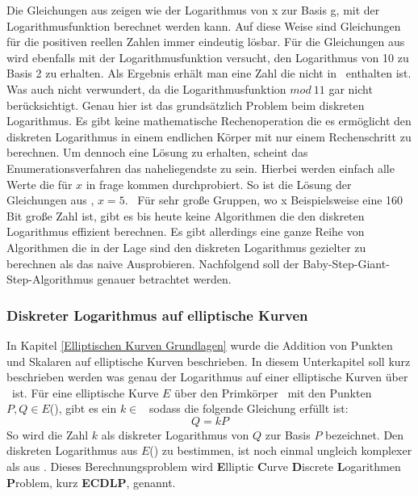 		Die Gleichungen aus  zeigen wie der Logarithmus von x zur Basis g, mit der Logarithmusfunktion berechnet werden kann. Auf diese Weise sind Gleichungen für die positiven reellen Zahlen  immer eindeutig lösbar. Für die Gleichungen aus  wird ebenfalls mit der Logarithmusfunktion versucht, den Logarithmus von 10 zu Basis 2 zu erhalten. Als Ergebnis erhält man eine Zahl die nicht in \myZPStern~enthalten ist. Was auch nicht verwundert, da die Logarithmusfunktion $mod~11$ gar nicht berücksichtigt. Genau hier ist das grundsätzlich Problem beim diskreten Logarithmus. Es gibt keine mathematische Rechenoperation die es ermöglicht den diskreten Logarithmus in einem endlichen Körper mit nur einem Rechenschritt zu berechnen. Um dennoch eine Lösung zu erhalten, scheint das Enumerationsverfahren das naheliegendste zu sein. Hierbei werden einfach alle Werte die für $x$ in frage kommen durchprobiert. So ist die Lösung der Gleichungen aus , $x = 5$.~\cite{DLP:ECDLP:Probleme:und:Loesungen} Für sehr große Gruppen, wo x Beispielsweise eine 160 Bit große Zahl ist, gibt es bis heute keine Algorithmen die den diskreten Logarithmus effizient berechnen.\cite{Kryptografie:in:Theorie:und:Praxis} Es gibt allerdings eine ganze Reihe von Algorithmen die in der Lage sind den diskreten Logarithmus gezielter zu berechnen als das naive Ausprobieren. Nachfolgend soll der Baby-Step-Giant-Step-Algorithmus genauer betrachtet werden.
		
		
		\subsubsection{Diskreter Logarithmus auf elliptische Kurven}
			In Kapitel \ref{Elliptischen Kurven Grundlagen} wurde die Addition von Punkten und Skalaren auf elliptische Kurven beschrieben. In diesem Unterkapitel soll kurz beschrieben werden was genau der Logarithmus auf einer elliptische Kurven über \myZPStern~ist. Für eine elliptische Kurve $E$ über den Primkörper \myZPStern~mit den Punkten $P, Q \in E$(\myZPStern), gibt es ein $k \in$ \myZPStern~sodass die folgende Gleichung erfüllt ist:
			\begin{displaymath}
				Q = kP
			\end{displaymath}
			So wird die Zahl $k$ als diskreter Logarithmus von $Q$ zur Basis $P$ bezeichnet. Den diskreten Logarithmus aus $E$(\myZPStern) zu bestimmen, ist noch einmal ungleich komplexer als aus \myZPStern. Dieses Berechnungsproblem wird \textbf{E}lliptic \textbf{C}urve \textbf{D}iscrete \textbf{L}ogarithmen \textbf{P}roblem, kurz \textbf{ECDLP}, genannt.